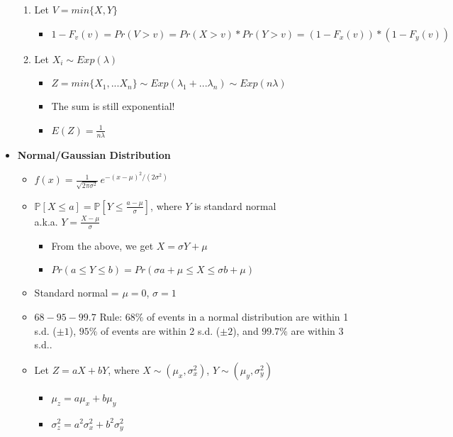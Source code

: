 \documentclass[a4paper]{article}
\begin{document}
\begin{itemize}
\begin{enumerate}
        \item Let $V = min\{X,Y\}$
        \begin{itemize}
            \item $1 - F_v(v) = Pr(V > v) = Pr(X > v) * Pr(Y > v) = (1 - F_x(v))* (1 - F_y(v))$
        \end{itemize}
        \item Let $X_i \sim Exp(\lambda)$
        \begin{itemize}
            \item $Z = min\{X_1, ... X_n\} \sim Exp(\lambda_1 +... \lambda_n) \sim Exp(n\lambda)$
            \item The sum is still exponential!
            \item $E(Z) = \frac{1}{n\lambda}$
        \end{itemize}
    \end{enumerate}
    \item \textbf{Normal/Gaussian Distribution}
    \begin{itemize}
        \item $f(x) = \frac{1}{\sqrt{2\pi\sigma^2}} \,e^{-(x-\mu)^2/(2\sigma^2)}$
        \item ${\mathbb{P}}[X\le a] = {\mathbb{P}}\!\left[Y\le \frac{a-\mu}{\sigma}\right]$, where $Y$ is standard normal\\ a.k.a. $Y = \frac{X- \mu}{\sigma}$
        \begin{itemize}
            \item From the above, we get $X = \sigma Y + \mu$
            \item $Pr(a \leq Y \leq b) = Pr(\sigma a + \mu \leq X \leq \sigma b + \mu)$
        \end{itemize}
        \item Standard normal = $\mu = 0$, $\sigma = 1$
        \item $68-95-99.7$ Rule: $68\%$ of events in a normal distribution are within 1 s.d. ($\pm 1$), $95\%$ of events are within 2 s.d. ($\pm 2$), and $99.7\%$ are within 3 s.d..
        \item Let $Z = aX + bY$, where $X \sim (\mu_x, \sigma^2_x)$, $Y \sim (\mu_y, \sigma^2_y)$
        \begin{itemize}
            \item $\mu_z = a\mu_x + b\mu_y$
            \item $\sigma^2_z = a^2\sigma^2_x + b^2\sigma^2_y$
        \end{itemize}

    \end{itemize}

\end{itemize}
\end{document}
